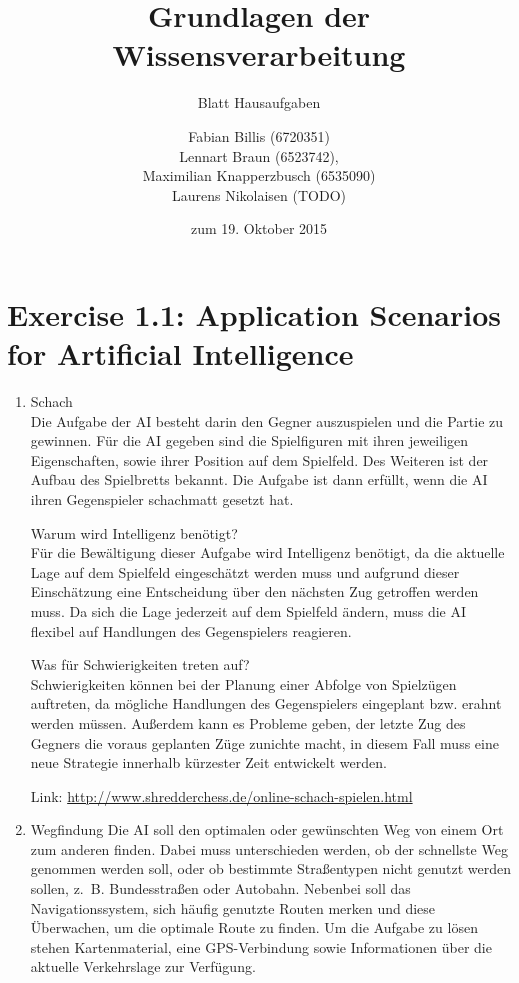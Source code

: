 \documentclass[a4paper]{scrartcl}
\title{Grundlagen der Wissensverarbeitung}
\subtitle{Blatt \blattnr Hausaufgaben}
\author{
    Fabian Billis (6720351) \\
    Lennart Braun (6523742), \\
    Maximilian Knapperzbusch (6535090) \\
    Laurens Nikolaisen (TODO)
}
\date{zum 19. Oktober 2015}
\begin{document}
\maketitle

\section*{Exercise 1.1: Application Scenarios for Artificial Intelligence}
  \begin{enumerate}
    \item{Schach} \\
      Die Aufgabe der AI besteht darin den Gegner auszuspielen und die Partie
      zu gewinnen. Für die AI gegeben sind die Spielfiguren mit ihren
      jeweiligen Eigenschaften, sowie ihrer Position auf dem Spielfeld. Des
      Weiteren ist der Aufbau des Spielbretts bekannt.  Die Aufgabe ist dann
      erfüllt, wenn die AI ihren Gegenspieler schachmatt gesetzt hat.

      Warum wird Intelligenz benötigt? \\
      Für die Bewältigung dieser Aufgabe wird Intelligenz benötigt, da die
      aktuelle Lage auf dem Spielfeld eingeschätzt werden muss und aufgrund
      dieser Einschätzung eine Entscheidung über den nächsten Zug getroffen
      werden muss. Da sich die Lage jederzeit auf dem Spielfeld ändern, muss
      die AI flexibel auf Handlungen des Gegenspielers reagieren.

      Was für Schwierigkeiten treten auf?\\
      Schwierigkeiten können bei der Planung einer Abfolge von Spielzügen
      auftreten, da mögliche Handlungen des Gegenspielers eingeplant bzw.
      erahnt werden müssen.  Außerdem kann es Probleme geben, der letzte Zug
      des Gegners die voraus geplanten Züge zunichte macht, in diesem Fall muss
      eine neue Strategie innerhalb kürzester Zeit entwickelt werden.

      Link: \url{http://www.shredderchess.de/online-schach-spielen.html}

    \item{Wegfindung}
      Die AI soll den optimalen oder gewünschten Weg von einem Ort zum anderen
      finden.  Dabei muss unterschieden werden, ob der schnellste Weg genommen
      werden soll, oder ob bestimmte Straßentypen nicht genutzt werden sollen,
      z.~B. Bundesstraßen oder Autobahn. Nebenbei soll das Navigationssystem,
      sich häufig genutzte Routen merken und diese Überwachen, um die optimale
      Route zu finden. Um die Aufgabe zu lösen stehen Kartenmaterial, eine
      GPS-Verbindung sowie Informationen über die aktuelle Verkehrslage zur
      Verfügung.


\end{enumerate}
\end{document}
